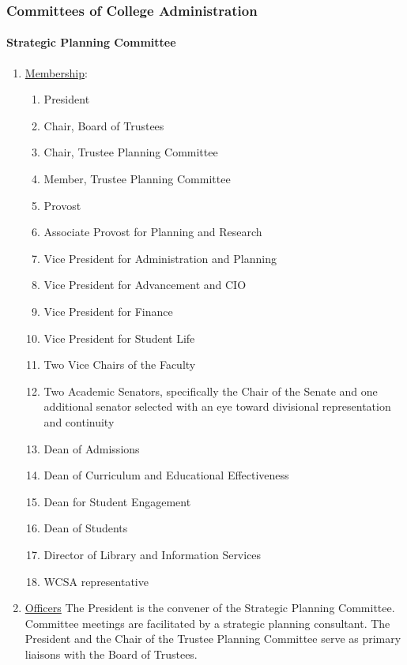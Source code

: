 \documentclass[letterpaper, 11pt]{article}
\begin{document}
		\subsubsection{Committees of College Administration}
			\paragraph{Strategic Planning Committee}
				\begin{enumerate}[label=\alph*)]
					\item{\underline{Membership}:
						\begin{enumerate}[label=\arabic*)]
							\item{President}
							\item{Chair, Board of Trustees}
							\item{Chair, Trustee Planning Committee}
							\item{Member, Trustee Planning Committee}
							\item{Provost}
							\item{Associate Provost for Planning and Research}
							\item{Vice President for Administration and Planning}
							\item{Vice President for Advancement and CIO}
							\item{Vice President for Finance}
							\item{Vice President for Student Life}
							\item{Two Vice Chairs of the Faculty}
							\item{Two Academic Senators, specifically the Chair of the Senate and one additional senator selected with an eye toward divisional representation and continuity}
							\item{Dean of Admissions}
							\item{Dean of Curriculum and Educational Effectiveness}
							\item{Dean for Student Engagement}
							\item{Dean of Students}
							\item{Director of Library and Information Services}
							\item{WCSA representative}
						\end{enumerate}
					}
					\item{\underline{Officers}
						The President is the convener of the Strategic Planning Committee.  Committee meetings are facilitated by a strategic planning consultant.  The President and the Chair of the Trustee Planning Committee serve as primary liaisons with the Board of Trustees.}

\end{enumerate}
\end{document}
